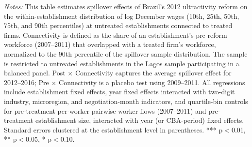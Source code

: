 \documentclass[12pt,letterpaper]{article}
\begin{document}
\begin{table}[]
\begin{threeparttable}
\begin{tablenotes}
\item \textit{Notes:} This table estimates spillover effects of Brazil's 2012 ultractivity reform on the within-establishment distribution of log December wages (10th, 25th, 50th, 75th, and 90th percentiles) at untreated establishments connected to treated firms. Connectivity is defined as the share of an establishment's pre-reform workforce (2007--2011) that overlapped with a treated firm's workforce, normalized to the 90th percentile of the spillover sample distribution. The sample is restricted to untreated establishments in the Lagos sample participating in a balanced panel. Post $\times$ Connectivity captures the average spillover effect for 2012--2016; Pre $\times$ Connectivity is a placebo test using 2009--2011. All regressions include establishment fixed effects, year fixed effects interacted with two-digit industry, microregion, and negotiation-month indicators, and quartile-bin controls for pre-treatment per-worker pairwise worker flows (2007--2011) and pre-treatment establishment size, interacted with year (or CBA-period) fixed effects. Standard errors clustered at the establishment level in parentheses. *** p$<$0.01, ** p$<$0.05, * p$<$0.10.
\end{tablenotes}
\end{threeparttable}
\end{table}

\clearpage
\end{document}
